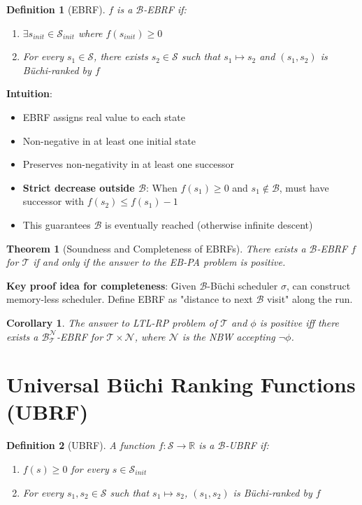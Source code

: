\documentclass{article}
\newtheorem{definition}{Definition}
\newtheorem{theorem}{Theorem}
\newtheorem{corollary}{Corollary}
\begin{document}
\begin{enumerate}
\begin{definition}[EBRF]
$f$ is a $\mathcal{B}$-EBRF if:
\begin{enumerate}
    \item $\exists s_{init} \in \mathcal{S}_{init}$ where $f(s_{init}) \geq 0$
    \item For every $s_1 \in \mathcal{S}$, there exists $s_2 \in \mathcal{S}$ such that $s_1 \mapsto s_2$ and $(s_1, s_2)$ is Büchi-ranked by $f$
\end{enumerate}
\end{definition}

\textbf{Intuition}:
\begin{itemize}
    \item EBRF assigns real value to each state
    \item Non-negative in at least one initial state
    \item Preserves non-negativity in at least one successor
    \item \textbf{Strict decrease outside $\mathcal{B}$}: When $f(s_1) \geq 0$ and $s_1 \notin \mathcal{B}$, must have successor with $f(s_2) \leq f(s_1) - 1$
    \item This guarantees $\mathcal{B}$ is eventually reached (otherwise infinite descent)
\end{itemize}

\begin{theorem}[Soundness and Completeness of EBRFs]
There exists a $\mathcal{B}$-EBRF $f$ for $\mathcal{T}$ if and only if the answer to the EB-PA problem is positive.
\end{theorem}

\textbf{Key proof idea for completeness}: Given $\mathcal{B}$-Büchi scheduler $\sigma$, can construct memory-less scheduler. Define EBRF as "distance to next $\mathcal{B}$ visit" along the run.

\begin{corollary}
The answer to LTL-RP problem of $\mathcal{T}$ and $\phi$ is positive iff there exists a $\mathcal{B}_{\mathcal{T}}^{\mathcal{N}}$-EBRF for $\mathcal{T} \times \mathcal{N}$, where $\mathcal{N}$ is the NBW accepting $\neg\phi$.
\end{corollary}

\section{Universal Büchi Ranking Functions (UBRF)}

\begin{definition}[UBRF]
A function $f: \mathcal{S} \rightarrow \mathbb{R}$ is a $\mathcal{B}$-UBRF if:
\begin{enumerate}
    \item $f(s) \geq 0$ for every $s \in \mathcal{S}_{init}$
    \item For every $s_1, s_2 \in \mathcal{S}$ such that $s_1 \mapsto s_2$, $(s_1, s_2)$ is Büchi-ranked by $f$
\end{enumerate}
\end{definition}


\end{enumerate}
\end{document}
